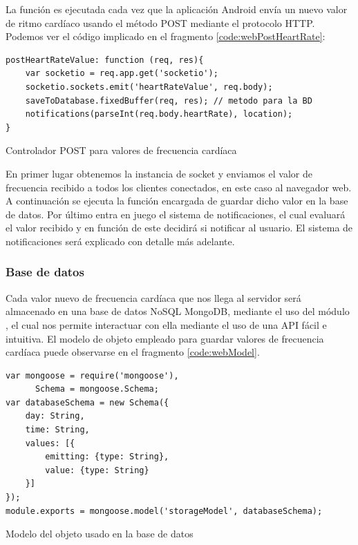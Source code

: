 La función  es ejecutada cada vez que la aplicación Android envía un nuevo valor de ritmo cardíaco usando el método POST mediante el protocolo HTTP. Podemos ver el código implicado en el fragmento \ref{code:webPostHeartRate}:

\begin{listing}[h] 
\begin{verbatim}
postHeartRateValue: function (req, res){
    var socketio = req.app.get('socketio');
    socketio.sockets.emit('heartRateValue', req.body);
    saveToDatabase.fixedBuffer(req, res); // metodo para la BD
    notifications(parseInt(req.body.heartRate), location); 
}
\end{verbatim}
\caption{Controlador POST para valores de frecuencia cardíaca}
\label{code:webPostHeartRate}
\end{listing}

En primer lugar obtenemos la instancia de socket y enviamos el valor de frecuencia recibido a todos los clientes conectados, en este caso al navegador web. A continuación se ejecuta la función encargada de guardar dicho valor en la base de datos. Por último entra en juego el sistema de notificaciones, el cual evaluará el valor recibido y en función de este decidirá si notificar al usuario. El sistema de notificaciones será explicado con detalle más adelante.

\subsubsection{Base de datos}
Cada valor nuevo de frecuencia cardíaca que nos llega al servidor será almacenado en una base de datos NoSQL MongoDB, mediante el uso del módulo , el cual nos permite interactuar con ella mediante el uso de una API fácil e intuitiva.
El modelo de objeto empleado para guardar valores de frecuencia cardíaca puede observarse en el fragmento \ref{code:webModel}.
\begin{listing}[h] 
\begin{verbatim}
var mongoose = require('mongoose'),
      Schema = mongoose.Schema;
var databaseSchema = new Schema({
    day: String,
    time: String,
    values: [{
        emitting: {type: String},
        value: {type: String}
    }]
});
module.exports = mongoose.model('storageModel', databaseSchema);
\end{verbatim}
\caption{Modelo del objeto usado en la base de datos}
\label{code:webModel}
\end{listing}

